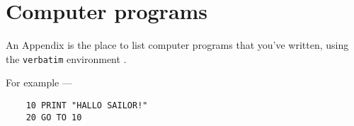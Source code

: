 \chapter{Computer programs}\label{app:programs}
An Appendix is the place to list computer programs that you've
written, using the {\tt verbatim} environment \cite[Sec.~2.11.4]{NSS}.
\par
For example ---
\begin{verbatim}
    10 PRINT "HALLO SAILOR!"
    20 GO TO 10
\end{verbatim}
